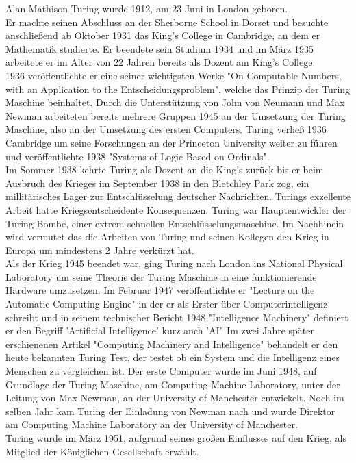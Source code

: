 Alan Mathison Turing wurde 1912, am 23 Juni in London geboren.\\
Er machte seinen Abschluss an der Sherborne School in Dorset und besuchte anschließend ab Oktober 1931 das King's College in Cambridge, an dem er Mathematik studierte. Er beendete sein Studium 1934 und im März 1935 arbeitete er im Alter von 22 Jahren bereits als Dozent am King's College.\\
1936 veröffentlichte er eine seiner wichtigsten Werke "On Computable Numbers, with an Application to the Entscheidungsproblem", welche das Prinzip der Turing Maschine beinhaltet. Durch die Unterstützung von John von Neumann und Max Newman arbeiteten bereits mehrere Gruppen 1945 an der Umsetzung der Turing Maschine, also an der Umsetzung des ersten Computers. Turing verließ 1936 Cambridge um seine Forschungen an der Princeton University weiter zu führen und veröffentlichte 1938 "Systems of Logic Based on Ordinals".\\ 
Im Sommer 1938 kehrte Turing als Dozent an die King's zurück bis er beim Ausbruch des Krieges im September 1938 in den Bletchley Park zog, ein millitärisches Lager zur Entschlüsselung deutscher Nachrichten. Turings exzellente Arbeit hatte Kriegsentscheidente Konsequenzen. Turing war Hauptentwickler der Turing Bombe, einer extrem schnellen Entschlüsselungsmaschine. Im Nachhinein wird vermutet das die Arbeiten von Turing und seinen Kollegen den Krieg in Europa um mindestens 2 Jahre verkürzt hat.\\
Als der Krieg 1945 beendet war, ging Turing nach London ins National Physical Laboratory um seine Theorie der Turing Maschine in eine funktionierende Hardware umzusetzen. Im Februar 1947 veröffentlichte er "Lecture on the Automatic Computing Engine" in der er als Erster über Computerintelligenz schreibt und in seinem technischer Bericht 1948 "Intelligence Machinery" definiert er den Begriff 'Artificial Intelligence' kurz auch 'AI'. Im zwei Jahre später erschienenen Artikel "Computing Machinery and Intelligence" behandelt er den heute bekannten Turing Test, der testet ob ein System und die Intelligenz eines Menschen zu vergleichen ist.
Der erste Computer wurde im Juni 1948, auf Grundlage der Turing Maschine, am Computing Machine Laboratory, unter der Leitung von Max Newman, an der University of Manchester entwickelt. Noch im selben Jahr kam Turing der Einladung von Newman nach und wurde Direktor am Computing Machine Laboratory an der University of Manchester.\\
Turing wurde im März 1951, aufgrund seines großen Einflusses auf den Krieg, als Mitglied der Königlichen Gesellschaft erwählt.

